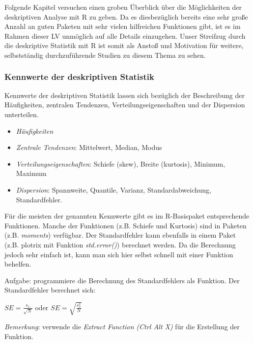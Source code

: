 \documentclass[]{article}
\providecommand{\tightlist}{%
  \setlength{\itemsep}{0pt}\setlength{\parskip}{0pt}}
\begin{document}
Folgende Kapitel versuchen einen groben Überblick über die Möglichkeiten
der deskriptiven Analyse mit R zu geben. Da es diesbezüglich bereits
eine sehr große Anzahl an guten Paketen mit sehr vielen hilfreichen
Funktionen gibt, ist es im Rahmen dieser LV unmöglich auf alle Details
einzugehen. Unser Streifzug durch die deskriptive Statistik mit R ist
somit als Anstoß und Motivation für weitere, selbstständig
durchzuführende Studien zu diesem Thema zu sehen.

\subsubsection*{Kennwerte der deskriptiven
Statistik}\label{kennwerte-der-deskriptiven-statistik}

Kennwerte der deskriptiven Statistik lassen sich bezüglich der
Beschreibung der Häufigkeiten, zentralen Tendenzen,
Verteilungseigenschaften und der Dispersion unterteilen.

\begin{itemize}
\tightlist
\item
  \emph{Häufigkeiten}
\item
  \emph{Zentrale Tendenzen}: Mittelwert, Median, Modus
\item
  \emph{Verteilungseigenschaften}: Schiefe (skew), Breite (kurtosis),
  Minimum, Maximum
\item
  \emph{Dispersion}: Spannweite, Quantile, Varianz, Standardabweichung,
  Standardfehler.
\end{itemize}

Für die meisten der genannten Kennwerte gibt es im R-Basispaket
entsprechende Funktionen. Manche der Funktionen (z.B. Schiefe und
Kurtosis) sind in Paketen (z.B. \emph{moments}) verfügbar. Der
Standardfehler kann ebenfalls in einem Paket (z.B. plotrix mit Funktion
\emph{std.error()}) berechnet werden. Da die Berechnung jedoch sehr
einfach ist, kann man sich hier selbst schnell mit einer Funktion
behelfen.

Aufgabe: programmiere die Berechnung des Standardfehlers als Funktion.
Der Standardfehler berechnet sich:

\(SE = \frac{s_x}{\sqrt{N}}\) oder \(SE = \sqrt{\frac{s^2_x}{N}}\)

\emph{Bemerkung}: verwende die \emph{Extract Function (Ctrl Alt X)} für
die Erstellung der Funktion.
\end{document}
